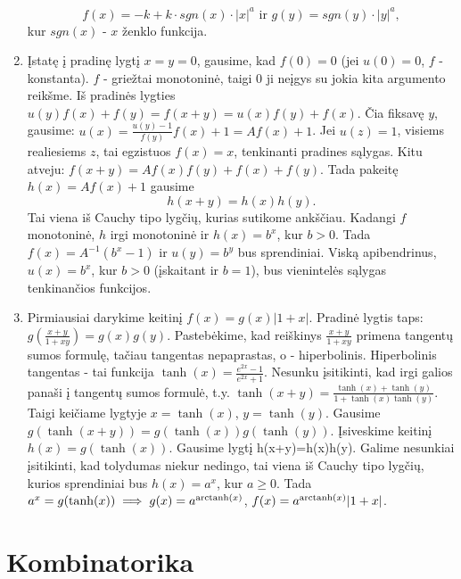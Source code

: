 \begin{enumerate}
    $$f(x)=-k+k\cdot sgn(x)\cdot |x|^a \text{ ir } g(y)=sgn(y)\cdot |y|^a,$$
    kur $sgn(x)$ - $x$ ženklo funkcija.
\item
    Įstatę į pradinę lygtį $x=y=0$, gausime, kad $f(0)=0$ (jei $u(0)=0$,
    $f$ - konstanta). $f$ - griežtai monotoninė, taigi $0$ ji neįgys su
    jokia kita argumento reikšme. Iš pradinės lygties
    $u(y)f(x)+f(y)=f(x+y)=u(x)f(y)+f(x)$. Čia fiksavę $y$, gausime:
    $u(x)=\frac{u(y)-1}{f(y)}f(x)+1=Af(x)+1$. Jei $u(z)=1$, visiems
    realiesiems $z$, tai egzistuos $f(x)=x$, tenkinanti pradines sąlygas.
    Kitu atveju: $f(x+y)=Af(x)f(y)+f(x)+f(y)$. Tada pakeitę $h(x)=Af(x)+1$
    gausime $$h(x+y)=h(x)h(y).$$ Tai viena iš Cauchy tipo lygčių, kurias
    sutikome ankščiau. Kadangi $f$ monotoninė, $h$ irgi monotoninė ir
    $h(x)=b^x$, kur $b>0$. Tada $f(x)=A^{-1}(b^x-1)$ ir $u(y)=b^y$ bus
    sprendiniai. Viską apibendrinus, $u(x)=b^x$, kur $b>0$ (įskaitant ir
    $b=1$), bus vienintelės sąlygas tenkinančios funkcijos.
\item
    Pirmiausiai darykime keitinį $f(x)=g(x)|1+x|$. Pradinė lygtis taps:
    $g(\frac{x+y}{1+xy})=g(x)g(y)$. Pastebėkime, kad reiškinys
    $\frac{x+y}{1+xy}$ primena tangentų sumos formulę, tačiau tangentas
    nepaprastas, o - hiperbolinis. Hiperbolinis tangentas - tai funkcija
    $\tanh (x)=\frac{e^{2x}-1}{e^{2x}+1}$. Nesunku įsitikinti, kad irgi
    galios panaši į tangentų sumos formulė, t.y. $\tanh(x+y)=\frac{\tanh
    (x)+\tanh (y)}{1+\tanh (x) \tanh (y)}$. Taigi keičiame lygtyje
    $x=\tanh(x)$, $y=\tanh(y)$. Gausime $g(\tanh(x+y))=g(\tanh(x))g(\tanh(y))$.
    Įsiveskime keitinį $h(x)=g(\tanh(x))$. Gausime lygtį h(x+y)=h(x)h(y).
    Galime nesunkiai įsitikinti, kad tolydumas niekur nedingo, tai viena
    iš Cauchy tipo lygčių, kurios sprendiniai bus $h(x)=a^{x}$, kur $a\geq
    0$. Tada $a^{x}=g(\tanh(x))\implies g(x)=a^{\operatorname{arctanh}(x)}$,
    $f(x)=a^{\operatorname{arctanh}(x)}|1+x|$.
\end{enumerate} 
\section*{Kombinatorika}
